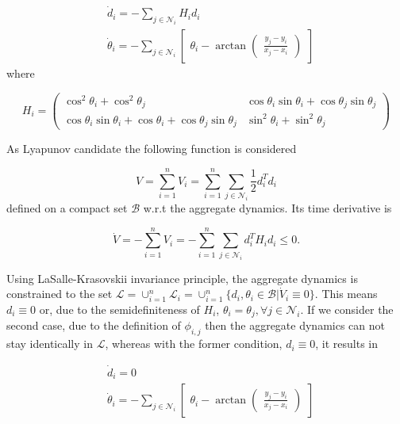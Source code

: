\documentclass[11pt]{article}
\begin{document}
\begin{align*}
&\dot{d}_i = -\sum_{j \in \mathcal{N}_i}H_id_i\\
&\dot{\theta}_i = -\sum_{j \in \mathcal{N}_i} \begin{bmatrix}\theta_i - \arctan\begin{pmatrix}
\frac{y_j-y_i}{x_j-x_i}
\end{pmatrix}\end{bmatrix}
\end{align*}
where

\begin{equation}
H_i = \begin{pmatrix}
\cos^2\theta_i+\cos^2\theta_j & \cos\theta_i\sin\theta_i+\cos\theta_j\sin\theta_j\\
\cos\theta_i\sin\theta_i+\cos\theta_i+\cos\theta_j\sin\theta_j & \sin^2\theta_i+\sin^2\theta_j
\end{pmatrix}
\end{equation}

As Lyapunov candidate the following function is considered

\begin{equation}
V = \sum_{i = 1}^nV_i = \sum_{i = 1}^n\sum_{j \in \mathcal{N}_i}\frac{1}{2}d_i^Td_i
\end{equation}
defined on a compact set $\mathcal{B}$ w.r.t the aggregate dynamics. Its time derivative is 

\begin{equation}
\dot{V} = - \sum_{i = 1}^nV_i = - \sum_{i = 1}^n\sum_{j \in \mathcal{N}_i} d_i^TH_id_i \leq 0.
\end{equation}

Using LaSalle-Krasovskii invariance principle, the aggregate dynamics is constrained to the set $\mathcal{L} = \cup_{i = 1}^n \mathcal{L}_i =  \cup_{i = 1}^n \{d_i,\theta_i \in \mathcal{B}|\dot{V}_i \equiv 0\}$. This means $d_i \equiv 0$ or, due to the semidefiniteness of $H_i$, $\theta_i = \theta_j, \forall j \in \mathcal{N}_i$. If we consider the second case, due to the definition of $\phi_{i,j}$ then the aggregate dynamics can not stay identically in $\mathcal{L}$, whereas with the former condition, $d_i \equiv 0$, it results in

\begin{align*}
&\dot{d}_i = 0\\
&\dot{\theta}_i = -\sum_{j \in \mathcal{N}_i} \begin{bmatrix}\theta_i - \arctan\begin{pmatrix}
\frac{y_j-y_i}{x_j-x_i}
\end{pmatrix}\end{bmatrix}
\end{align*}
\end{document}
